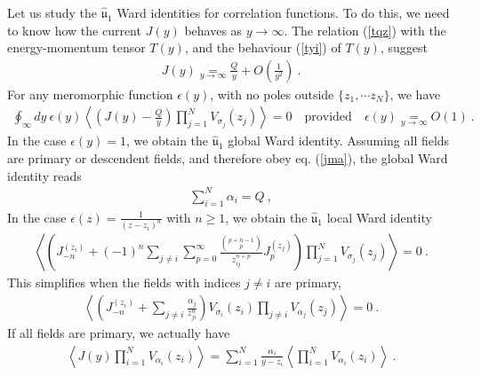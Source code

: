 \documentclass[12pt,a4paper,notitlepage]{report}
\newcommand \la {\left\langle}
\newcommand \ra {\right\rangle}
\numberwithin{equation}{section}
\theoremstyle{break}
\begin{document}
Let us study the $\hat{\mathfrak{u}}_1$ Ward identities for correlation functions. To do this, we need to know how the current $J(y)$ behaves as $y\rightarrow \infty$. The relation (\ref{tqz}) with the energy-momentum tensor $T(y)$, and the behaviour (\ref{tyi}) of $T(y)$, suggest
\begin{align}
 \boxed{J(y) \underset{y\rightarrow \infty}{=} \frac{Q}{y} + O\left(\frac{1}{y^2}\right)}\ .
\label{jyi}
\end{align}
For any meromorphic function $\epsilon(y)$, with no poles outside $\{z_1,\cdots z_N\}$, we have 
\begin{align}
 \oint_\infty dy\ \epsilon(y) \la \left(J(y)-\frac{Q}{y}\right)\prod_{j=1}^N V_{\sigma_j}(z_j)\ra = 0   \quad \text{provided} \quad \epsilon(y) \underset{y\rightarrow\infty}{=} O(1)\ .
\end{align}
In the case $\epsilon(y)=1$, we obtain the $\hat{\mathfrak{u}}_1$ global Ward identity. Assuming all fields are primary or descendent fields, and therefore obey eq. (\ref{jma}), the global Ward identity reads
\begin{align}
 \boxed{\sum_{i=1}^N \alpha_i = Q} \ ,
\label{saq}
\end{align}
In the case $\epsilon(z) = \frac{1}{(z-z_i)^{n}}$ with $n\geq 1$, we obtain the $\hat{\mathfrak{u}}_1$ local Ward identity
\begin{align}
\la \left(J_{-n}^{(z_i)}+ (-1)^{n}\sum_{j\neq i}\sum_{p=0}^\infty \frac{\binom{p+n-1}{p}}{z_{ij}^{n+p}}  J_p^{(z_j)}\right)\prod_{j=1}^N V_{\sigma_j}(z_j) \ra = 0\ .
\label{jnjp}
\end{align}
This simplifies when the fields with indices $j\neq i$ are primary, 
\begin{align}
 \la \left(J_{-n}^{(z_i)}  + \sum_{j\neq i} \frac{\alpha_j}{z_{ji}^n}\right) V_{\sigma_i}(z_i)\prod_{j\neq i} V_{\alpha_j}(z_j)\ra= 0\ .
\label{jnz}
\end{align}
If all fields are primary, we actually have 
\begin{align}
 \boxed{\la J(y) \prod_{i=1}^N V_{\alpha_i}(z_i) \ra = \sum_{i=1}^N \frac{\alpha_i}{y-z_i} \la \prod_{i=1}^N V_{\alpha_i}(z_i) \ra  }\ .
\label{jsa}
\end{align}
\end{document}
